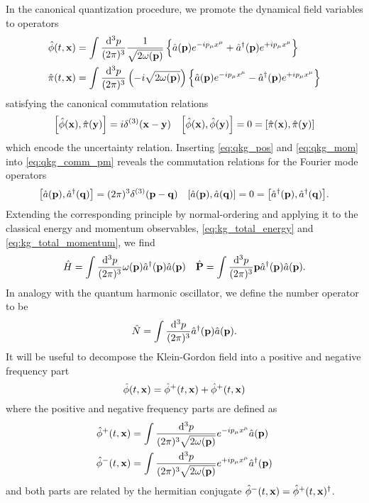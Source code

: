 In the canonical quantization procedure, we promote the dynamical field variables to operators
\begin{align}
	\hat\phi(t,\vb{x})
	&=
	\int\frac{\dd[3]{p}}{(2\pi)^3}
	\frac{1}{\sqrt{2\omega(\vb{p})}}
	\left\{
		\hat{a}(\vb{p})
		e^{-ip_\mu x^\mu}
		+
		\hat{a}^\dagger(\vb{p})
		e^{+ip_\mu x^\mu}
	\right\}
	\label{eq:qkg_pos}
	\\
	\hat\pi(t,\vb{x})
	&=
	\int\frac{\dd[3]{p}}{(2\pi)^3}
	\left(-i\sqrt{2\omega(\vb{p})}\right)
	\left\{
		\hat{a}(\vb{p})
		e^{-ip_\mu x^\mu}
		-
		\hat{a}^\dagger(\vb{p})
		e^{+ip_\mu x^\mu}
	\right\}
	\label{eq:qkg_mom}
\end{align}
satisfying the canonical commutation relations
\begin{align}
	\comm{\hat\phi(\vb{x})}{\hat\pi(\vb{y})}
	=
	i\delta^{(3)}(\vb{x}-\vb{y})
	&&
	\comm{\hat\phi(\vb{x})}{\hat\phi(\vb{y})}
	=
	0
	=
	\comm{\hat\pi(\vb{x})}{\hat\pi(\vb{y})}
	\label{eq:qkg_comm_pm}	
\end{align}
which encode the uncertainty relation.
Inserting \cref{eq:qkg_pos} and \cref{eq:qkg_mom} into \cref{eq:qkg_comm_pm} reveals the commutation relations for the Fourier mode operators
\begin{align}
	\comm{\hat{a}(\vb{p})}{\hat{a}^\dagger(\vb{q})}
	=
	(2\pi)^3\delta^{(3)}(\vb{p}-\vb{q})
	&&
	\comm{\hat{a}(\vb{p})}{\hat{a}(\vb{q})}
	=
	0
	=
	\comm{\hat{a}^\dagger(\vb{p})}{\hat{a}^\dagger(\vb{q})}
	\label{eq:kg_comm_ac}.
\end{align}
Extending the corresponding principle by normal-ordering and applying it to the classical energy and momentum observables, \cref{eq:kg_total_energy} and \cref{eq:kg_total_momentum}, we find
\begin{align}
	\hat{H}
	=
	\int\frac{\dd[3]{p}}{(2\pi)^3}
	\omega(\vb{p})\hat{a}^\dagger(\vb{p})\hat{a}(\vb{p})
	&&
	\hat{\vb{P}}
	=
	\int\frac{\dd[3]{p}}{(2\pi)^3}
	\vb{p}\hat{a}^\dagger(\vb{p})\hat{a}(\vb{p})
	\label{eq:qkg_total_energy_momentum}.
\end{align}
In analogy with the quantum harmonic oscillator, we define the number operator to be
\begin{equation}
	\hat{N}
	=
	\int\frac{\dd[3]{p}}{(2\pi)^3}
	\hat{a}^\dagger(\vb{p})
	\hat{a}(\vb{p})
	\label{eq:qkg_number}.
\end{equation}
It will be useful to decompose the Klein-Gordon field into a positive and negative frequency part
\begin{equation}
	\hat\phi(t,\vb{x})
	=
	\hat\phi^+(t,\vb{x})
	+
	\hat\phi^+(t,\vb{x})
\end{equation}
where the positive and negative frequency parts are defined as~\cite[p.~26]{Peskin1995}
\begin{align}
	\hat\phi^+(t,\vb{x})
	&=
	\int\frac{\dd[3]{p}}{(2\pi)^3\sqrt{2\omega(\vb{p})}}
	e^{-ip_\mu x^\mu}
	\hat{a}(\vb{p})
	\\
	\hat\phi^-(t,\vb{x})
	&=
	\int\frac{\dd[3]{p}}{(2\pi)^3\sqrt{2\omega(\vb{p})}}
	e^{+ip_\mu x^\mu}
	\hat{a}^\dagger(\vb{p})
\end{align}
and both parts are related by the hermitian conjugate $\hat\phi^-(t,\vb{x})=\hat\phi^+(t,\vb{x})^\dagger$.

